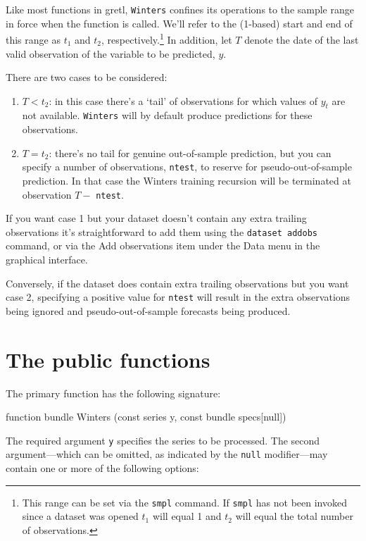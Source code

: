 \documentclass{article}
\begin{document}
Like most functions in gretl, \texttt{Winters} confines its operations
to the sample range in force when the function is called. We'll refer
to the (1-based) start and end of this range as $t_1$ and $t_2$,
respectively.\footnote{This range can be set via the \texttt{smpl}
  command. If \texttt{smpl} has not been invoked since a dataset was
  opened $t_1$ will equal 1 and $t_2$ will equal the total number of
  observations.}  In addition, let $T$ denote the date of the last
valid observation of the variable to be predicted, $y$.

There are two cases to be considered:
\begin{enumerate}
\item $T < t_2$: in this case there's a `tail' of observations for
  which values of $y_t$ are not available.  \texttt{Winters} will by
  default produce predictions for these observations.
\item $T = t_2$: there's no tail for genuine out-of-sample prediction,
  but you can specify a number of observations, \texttt{ntest}, to
  reserve for pseudo-out-of-sample prediction. In that case the
  Winters training recursion will be terminated at observation $T-$
  \texttt{ntest}.
\end{enumerate}

If you want case 1 but your dataset doesn't contain any extra trailing
observations it's straightforward to add them using the
\texttt{dataset addobs} command, or via the \textsf{Add observations}
item under the \textsf{Data} menu in the graphical interface.

Conversely, if the dataset does contain extra trailing observations
but you want case 2, specifying a positive value for \texttt{ntest}
will result in the extra observations being ignored and
pseudo-out-of-sample forecasts being produced.

\section{The public functions}

The primary function has the following signature:
\begin{nscode}
function bundle Winters (const series y, const bundle specs[null])
\end{nscode}

The required argument \texttt{y} specifies the series to be processed.
The second argument---which can be omitted, as indicated by the
\texttt{null} modifier---may contain one or more of the following
options:
\end{document}
